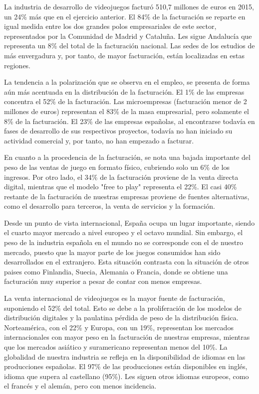La industria de desarrollo de videojuegos facturó 510,7 millones de euros en 2015, un 24\% más que en el ejercicio anterior. El 84\% de la facturación se reparte en igual medida entre los dos grandes polos empresariales de este sector, representados por la Comunidad de Madrid y Cataluña. Les sigue Andalucía que representa un 8\% del total de la facturación nacional. Las sedes de los estudios de más envergadura y, por tanto, de mayor facturación, están localizadas en estas regiones.

La tendencia a la polarización que se observa en el empleo, se presenta de forma aún más acentuada en la distribución de la facturación. El 1\% de las empresas concentra el 52\% de la facturación. Las microempresas (facturación menor de 2 millones de euros) representan el 83\% de la masa empresarial, pero solamente el 8\% de la facturación. El 23\% de las empresas españolas, al encontrarse todavía en fases de desarrollo de sus respectivos proyectos, todavía no han iniciado su actividad comercial y, por tanto, no han empezado a facturar.

En cuanto a la procedencia de la facturación, se nota una bajada importante del peso de las ventas de juego en formato físico, cubriendo solo un 6\% de los ingresos. Por otro lado, el 34\% de la facturación proviene de la venta directa digital, mientras que el modelo "free to play" representa el 22\%. El casi 40\% restante de la facturación de nuestras empresas proviene de fuentes alternativas, como el desarrollo para terceros, la venta de servicios y la formación. 

Desde un punto de vista internacional, España ocupa un lugar importante, siendo el cuarto mayor mercado a nivel europeo y el octavo mundial. Sin embargo, el peso de la industria española en el mundo no se corresponde con el de nuestro mercado, puesto que la mayor parte de los juegos consumidos han sido desarrollados en el extranjero. Esta situación contrasta con la situación de otros paises como Finlandia, Suecia, Alemania o Francia, donde se obtiene una facturación muy superior a pesar de contar con menos empresas.

La venta internacional de videojuegos es la mayor fuente de facturación, suponiendo el 52\% del total. Esto se debe a la proliferación de los modelos de distribución digitales y la paulatina pérdida de peso de la distribución física. Norteamérica, con el 22\% y Europa, con un 19\%, representan  los mercados internacionales con mayor peso en la facturación de nuestras empresas, mientras que los mercados asiático y  suramericano representan menos del 10\%. La globalidad de nuestra industria se refleja en la disponibilidad de idiomas en las producciones españolas. El 97\% de las producciones están disponibles en inglés, idioma que supera al castellano (95\%). Les siguen otros idiomas europeos, como el francés y el alemán, pero con menos incidencia. 

